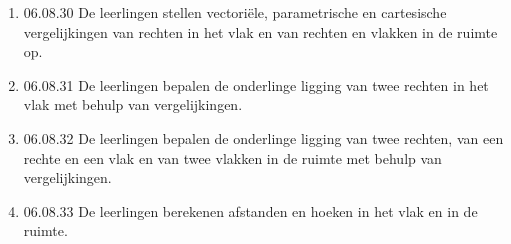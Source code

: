 \documentclass{article}
\begin{document}
\begin{enumerate}
    \item 06.08.30 De leerlingen stellen vectoriële, parametrische en cartesische vergelijkingen van rechten in het vlak en van rechten en vlakken in de ruimte op.
    
    \item 06.08.31 De leerlingen bepalen de onderlinge ligging van twee rechten in het vlak met behulp van vergelijkingen.
    
    \item 06.08.32 De leerlingen bepalen de onderlinge ligging van twee rechten, van een rechte en een vlak en van twee vlakken in de ruimte met behulp van vergelijkingen.
    
    \item 06.08.33 De leerlingen berekenen afstanden en hoeken in het vlak en in de ruimte.
    
\end{enumerate}
    
\end{document}

